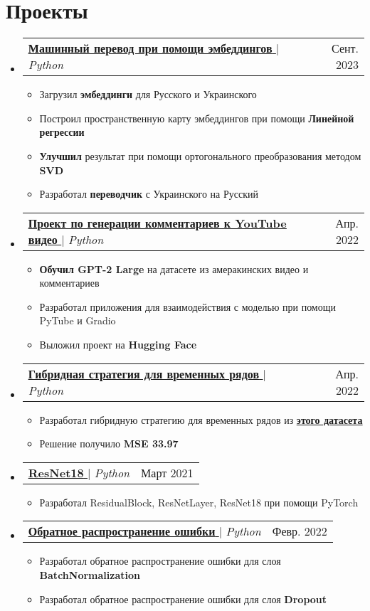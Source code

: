 \documentclass[english,russian,letterpaper,11pt]{article}
\makeatletter
\newcommand{\resumeItem}[1]{
  \item\small{
    {#1 \vspace{-2pt}}
  }
}
\newcommand{\resumeProjectHeading}[2]{
    \item
    \begin{tabular*}{0.97\textwidth}{l@{\extracolsep{\fill}}r}
      \small#1 & #2 \\
    \end{tabular*}\vspace{-7pt}
}
\newcommand{\resumeSubHeadingListStart}{\begin{itemize}[leftmargin=0.15in, label={}]}
\newcommand{\resumeSubHeadingListEnd}{\end{itemize}}
\newcommand{\resumeItemListStart}{\begin{itemize}}
\newcommand{\resumeItemListEnd}{\end{itemize}\vspace{-5pt}}
\makeatother
\begin{document}
\section{Проекты}
\resumeSubHeadingListStart
    \resumeProjectHeading
      {\href{https://github.com/alexbuyan/nlp_course/blob/2023/week01_embeddings/homework.ipynb}{\underline{\textbf{Машинный перевод при помощи эмбеддингов}} \faGithub} $|$ \emph{Python}}{Сент. 2023}
      \resumeItemListStart
        \resumeItem{Загрузил \textbf{эмбеддинги} для Русского и Украинского}
        \resumeItem{Построил пространственную карту эмбеддингов при помощи \textbf{Линейной регрессии}}
        \resumeItem{\textbf{Улучшил} результат при помощи ортогонального преобразования методом \textbf{SVD}}
        \resumeItem{Разработал \textbf{переводчик} с Украинского на Русский}
      \resumeItemListEnd
    \resumeProjectHeading
        {\href{https://huggingface.co/spaces/alexbuyan/yt_videos_comments_devops_projects}{\underline{\textbf{Проект по генерации комментариев к YouTube видео}} \faGithub} $|$ \emph{Python}}{Апр. 2022}
        \resumeItemListStart
          \resumeItem{\textbf{Обучил GPT-2 Large} на датасете из амеракинских видео и комментариев}
          \resumeItem{Разработал приложения для взаимодействия с моделью при помощи PyTube и Gradio}
          \resumeItem{Выложил проект на \textbf{Hugging Face}}
        \resumeItemListEnd
    \resumeProjectHeading
        {\href{https://github.com/alexbuyan/ml_projects/tree/main/hybrid_strategy}{\underline{\textbf{Гибридная стратегия для временных рядов}} \faGithub} $|$ \emph{Python}}{Апр. 2022}
        \resumeItemListStart
          \resumeItem{Разработал гибридную стратегию для временных рядов из \href{https://www.kaggle.com/c/demand-forecasting-kernels-only}{\underline{\textbf{этого датасета}}}}
          \resumeItem{Решение получило \textbf{MSE 33.97}}
        \resumeItemListEnd
    \resumeProjectHeading
        {\href{https://github.com/alexbuyan/ml_projects/tree/main/resnet18}{\underline{\textbf{ResNet18}} \faGithub} $|$ \emph{Python}}{Март 2021}
        \resumeItemListStart
          \resumeItem{Разработал ResidualBlock, ResNetLayer, ResNet18 при помощи PyTorch}
        \resumeItemListEnd
    \resumeProjectHeading
        {\href{https://github.com/alexbuyan/ml_projects/tree/main/backprop}{\underline{\textbf{Обратное распространение ошибки}} \faGithub} $|$ \emph{Python}}{Февр. 2022}
        \resumeItemListStart
          \resumeItem{Разработал обратное распространение ошибки для слоя \textbf{BatchNormalization}}
          \resumeItem{Разработал обратное распространение ошибки для слоя \textbf{Dropout}}
        \resumeItemListEnd
\resumeSubHeadingListEnd
\end{document}
